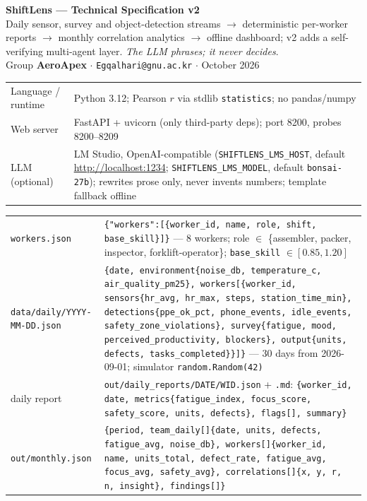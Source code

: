 \documentclass[10pt,a4paper]{article}
\newcommand{\hd}[1]{\vspace{2.5pt}{\bfseries\color{slblue}#1}\par\vspace{1pt}}
\begin{document}
\begin{center}
{\Large\bfseries\color{slblue} ShiftLens --- Technical Specification v2}\\[1pt]
{\small Daily sensor, survey and object-detection streams $\to$ deterministic per-worker
reports $\to$ monthly correlation analytics $\to$ offline dashboard; v2 adds a
self-verifying multi-agent layer. \emph{The LLM phrases; it never decides}.}\\[1pt]
{\small Group \textbf{AeroApex} \;$\cdot$\; \texttt{Egqalhari@gnu.ac.kr} \;$\cdot$\; October 2026}
\end{center}
\vspace{-2pt}

\hd{Stack}
\begin{tabular}{@{}p{2.6cm}p{15.1cm}@{}}
Language / runtime & Python 3.12; Pearson $r$ via stdlib \texttt{statistics}; no pandas/numpy\\
Web server & FastAPI + uvicorn (only third-party deps); port 8200, probes 8200--8209\\
LLM (optional) & LM Studio, OpenAI-compatible (\texttt{SHIFTLENS\_LMS\_HOST}, default
\url{http://localhost:1234}; \texttt{SHIFTLENS\_LMS\_MODEL}, default \texttt{bonsai-27b});
rewrites prose only, never invents numbers; template fallback offline\\
\end{tabular}

\hd{Data schemas}
\begin{tabular}{@{}p{3.4cm}p{14.3cm}@{}}
\texttt{workers.json} & \texttt{\{"workers":[\{worker\_id, name, role, shift,
base\_skill\}]\}} --- 8 workers; role $\in$ \{assembler, packer, inspector,
forklift-operator\}; \texttt{base\_skill} $\in [0.85, 1.20]$\\
\texttt{data/daily/}\newline\texttt{YYYY-MM-DD.json} & \texttt{\{date, environment\{noise\_db,
temperature\_c, air\_quality\_pm25\}, workers[\{worker\_id, sensors\{hr\_avg, hr\_max,
steps, station\_time\_min\}, detections\{ppe\_ok\_pct, phone\_events, idle\_events,
safety\_zone\_violations\}, survey\{fatigue, mood, perceived\_productivity, blockers\},
output\{units, defects, tasks\_completed\}\}]\}} --- 30 days from 2026-09-01; simulator
\texttt{random.Random(42)}\\
daily report & \texttt{out/daily\_reports/DATE/WID.json} + \texttt{.md}:
\texttt{\{worker\_id, date, metrics\{fatigue\_index, focus\_score, safety\_score, units,
defects\}, flags[], summary\}}\\
\texttt{out/monthly.json} & \texttt{\{period, team\_daily[]\{date, units, defects,
fatigue\_avg, noise\_db\}, workers[]\{worker\_id, name, units\_total, defect\_rate,
fatigue\_avg, focus\_avg, safety\_avg\}, correlations[]\{x, y, r, n, insight\},
findings[]\}}\\
\end{tabular}
\end{document}
